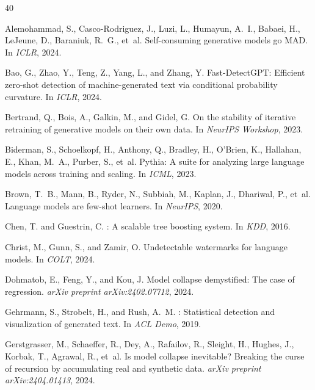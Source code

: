 \documentclass[letterpaper]{article}
\begin{document}
\begin{thebibliography}{40}

Alemohammad, S., Casco-Rodriguez, J., Luzi, L., Humayun, A.~I., Babaei, H., LeJeune, D., Baraniuk, R.~G., et~al.
\newblock Self-consuming generative models go MAD.
\newblock In \emph{ICLR}, 2024.

Bao, G., Zhao, Y., Teng, Z., Yang, L., and Zhang, Y.
\newblock Fast-{D}etect{GPT}: Efficient zero-shot detection of machine-generated text via conditional probability curvature.
\newblock In \emph{ICLR}, 2024.

Bertrand, Q., Bois, A., Galkin, M., and Gidel, G.
\newblock On the stability of iterative retraining of generative models on their own data.
\newblock In \emph{NeurIPS Workshop}, 2023.

Biderman, S., Schoelkopf, H., Anthony, Q., Bradley, H., O'Brien, K., Hallahan, E., Khan, M.~A., Purber, S., et~al.
\newblock Pythia: A suite for analyzing large language models across training and scaling.
\newblock In \emph{ICML}, 2023.

Brown, T.~B., Mann, B., Ryder, N., Subbiah, M., Kaplan, J., Dhariwal, P., et~al.
\newblock Language models are few-shot learners.
\newblock In \emph{NeurIPS}, 2020.

Chen, T. and Guestrin, C.
: A scalable tree boosting system.
\newblock In \emph{KDD}, 2016.

Christ, M., Gunn, S., and Zamir, O.
\newblock Undetectable watermarks for language models.
\newblock In \emph{COLT}, 2024.

Dohmatob, E., Feng, Y., and Kou, J.
\newblock Model collapse demystified: The case of regression.
\newblock \emph{arXiv preprint arXiv:2402.07712}, 2024.

Gehrmann, S., Strobelt, H., and Rush, A.~M.
: Statistical detection and visualization of generated text.
\newblock In \emph{ACL Demo}, 2019.

Gerstgrasser, M., Schaeffer, R., Dey, A., Rafailov, R., Sleight, H., Hughes, J., Korbak, T., Agrawal, R., et~al.
\newblock Is model collapse inevitable? Breaking the curse of recursion by accumulating real and synthetic data.
\newblock \emph{arXiv preprint arXiv:2404.01413}, 2024.


\end{thebibliography}
\end{document}
